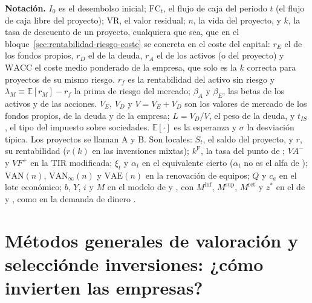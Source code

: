 \documentclass[11pt]{article}
\begin{document}
\begin{anotaciones}
\textbf{Notación.} $I_0$ es el desembolso inicial; $\mathrm{FC}_t$, el flujo de caja del periodo $t$ (el flujo de caja libre del proyecto); $\mathrm{VR}$, el valor residual; $n$, la vida del proyecto, y $k$, la tasa de descuento de un proyecto, cualquiera que sea, que en el bloque~\ref{sec:rentabilidad-riesgo-coste} se concreta en el coste del capital: $r_E$ el de los fondos propios, $r_D$ el de la deuda, $r_A$ el de los activos (o del proyecto) y $\mathrm{WACC}$ el coste medio ponderado de la empresa, que solo es la $k$ correcta para proyectos de su mismo riesgo. $r_f$ es la rentabilidad del activo sin riesgo y $\lambda_M\equiv\mathbb{E}[r_M]-r_f$ la prima de riesgo del mercado; $\beta_A$ y $\beta_E$, las betas de los activos y de las acciones. $V_E$, $V_D$ y $V=V_E+V_D$ son los valores de mercado de los fondos propios, de la deuda y de la empresa; $L=V_D/V$, el peso de la deuda, y $t_{IS}$, el tipo del impuesto sobre sociedades. $\mathbb{E}[\cdot]$ es la esperanza y $\sigma$ la desviación típica. Los proyectos se llaman A y B. Son locales: $S_t$, el saldo del proyecto, y $r$, su rentabilidad ($r(k)$ en las inversiones mixtas); $k^{\mathrm F}$, la tasa del punto de ; $VA^{-}$ y $VF^{+}$ en la TIR modificada; $\xi_t$ y $\alpha_t$ en el equivalente cierto ($\alpha_t$ no es el alfa de ); $\mathrm{VAN}(n)$, $\mathrm{VAN}_\infty(n)$ y $\mathrm{VAE}(n)$ en la renovación de equipos; $Q$ y $c_a$ en el lote económico; $b$, $Y$, $i$ y $M$ en el modelo de  y , con $M^{\mathrm{inf}}$, $M^{\mathrm{sup}}$, $M^{\mathrm{ret}}$ y $z^*$ en el de  y , como en la demanda de dinero .
\end{anotaciones}

\section{Métodos generales de valoración y selección\newline de inversiones: ¿cómo invierten las empresas?}\label{sec:criterios}
\end{document}
